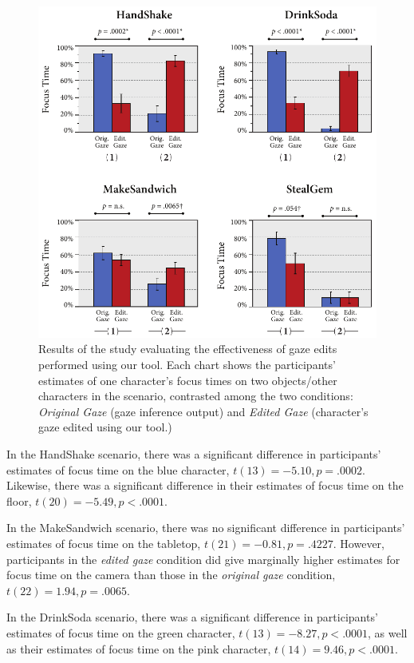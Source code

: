 \begin{figure}
\centering
\includegraphics[width=1\textwidth]{gazeauthoring/Figures/StudyResults2.pdf}
\caption{Results of the study evaluating the effectiveness of gaze edits performed using our tool. Each chart shows the participants' estimates of one character's focus times on two objects/other characters in the scenario, contrasted among the two conditions: \emph{Original Gaze} (gaze inference output) and \emph{Edited Gaze} (character's gaze edited using our tool.)}
\label{fig:GazeEditEffectResults}
\end{figure}

In the HandShake scenario, there was a significant difference in participants' estimates of focus time on the blue character, $t(13) = -5.10, p = .0002$. Likewise, there was a significant difference in their estimates of focus time on the floor, $t(20) = -5.49, p < .0001$.

In the MakeSandwich scenario, there was no significant difference in participants' estimates of focus time on the tabletop, $t(21) = -0.81, p = .4227$. However, participants in the \emph{edited gaze} condition did give marginally higher estimates for focus time on the camera than those in the \emph{original gaze} condition, $t(22) = 1.94, p = .0065$.

In the DrinkSoda scenario, there was a significant difference in participants' estimates of focus time on the green character, $t(13) = -8.27, p < .0001$, as well as their estimates of focus time on the pink character, $t(14) = 9.46, p < .0001$.

